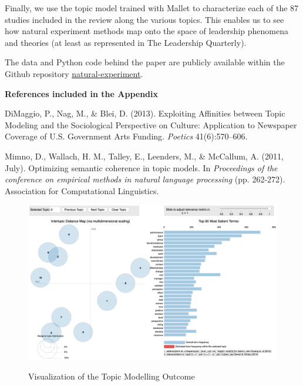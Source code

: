 \documentclass[english]{article}
\begin{document}
\begin{appendices}
Finally, we use the topic model trained with Mallet to characterize each
of the 87 studies included in the review along the various topics. This
enables us to see how natural experiment methods map onto the space of
leadership phenomena and theories (at least as represented in The
Leadership Quarterly).

The data and Python code behind the paper are publicly available within the
Github repository 
\href{https://github.com/simoneSantoni/natural-experiments/tree/master/background/santoni-sieweke-LQ}{natural-experiment}.

\noindent \textbf{References included in the Appendix}

\begin{list}{}{\setlength\itemindent{-\leftmargin}}

\item DiMaggio, P., Nag, M., \& Blei, D. (2013). Exploiting Affinities
    between Topic Modeling and the Sociological Perspective on Culture:
    Application to Newspaper Coverage of U.S. Government Arts Funding.
    \textit{Poetics} 41(6):570–606.

\item Mimno, D., Wallach, H. M., Talley, E., Leenders, M., \& McCallum, A. (2011,
July). Optimizing semantic coherence in topic models. In \textit{Proceedings of
the conference on empirical methods in natural language processing} (pp.
262-272). Association for Computational Linguistics.

\end{list}

\begin{figure}
	\centering
	\caption{Visualization of the Topic Modelling Outcome}
	\includegraphics[width=1\textwidth]{B_1}
	\label{fig:pyldavis}
\end{figure}



\end{appendices}

\clearpage

\end{document}
